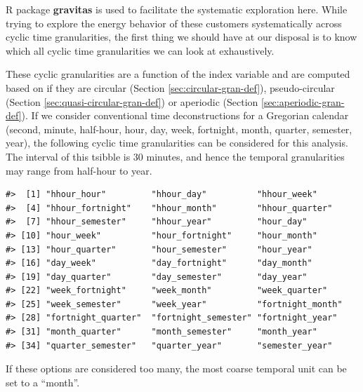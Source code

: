 \documentclass[12pt]{article}
\newenvironment{Shaded}{\begin{snugshade}}{\end{snugshade}}
\newcommand{\DataTypeTok}[1]{\textcolor[rgb]{0.13,0.29,0.53}{#1}}
\newcommand{\KeywordTok}[1]{\textcolor[rgb]{0.13,0.29,0.53}{\textbf{#1}}}
\newcommand{\NormalTok}[1]{#1}
\newcommand{\OperatorTok}[1]{\textcolor[rgb]{0.81,0.36,0.00}{\textbf{#1}}}
\newcommand{\StringTok}[1]{\textcolor[rgb]{0.31,0.60,0.02}{#1}}
\begin{document}
R package \textbf{gravitas} \citep{R-gravitas} is used to facilitate the systematic exploration here. While trying to explore the energy behavior of these customers systematically across cyclic time granularities, the first thing we should have at our disposal is to know which all cyclic time granularities we can look at exhaustively.

These cyclic granularities are a function of the index variable and are computed based on if they are circular (Section \ref{sec:circular-gran-def}), pseudo-circular (Section \ref{sec:quasi-circular-gran-def}) or aperiodic (Section \ref{sec:aperiodic-gran-def}). If we consider conventional time deconstructions for a Gregorian calendar (second, minute, half-hour, hour, day, week, fortnight, month, quarter, semester, year), the following cyclic time granularities can be considered for this analysis. The interval of this tsibble is 30 minutes, and hence the temporal granularities may range from half-hour to year.

\begin{Shaded}
\end{Shaded}

\begin{verbatim}
#>  [1] "hhour_hour"         "hhour_day"          "hhour_week"        
#>  [4] "hhour_fortnight"    "hhour_month"        "hhour_quarter"     
#>  [7] "hhour_semester"     "hhour_year"         "hour_day"          
#> [10] "hour_week"          "hour_fortnight"     "hour_month"        
#> [13] "hour_quarter"       "hour_semester"      "hour_year"         
#> [16] "day_week"           "day_fortnight"      "day_month"         
#> [19] "day_quarter"        "day_semester"       "day_year"          
#> [22] "week_fortnight"     "week_month"         "week_quarter"      
#> [25] "week_semester"      "week_year"          "fortnight_month"   
#> [28] "fortnight_quarter"  "fortnight_semester" "fortnight_year"    
#> [31] "month_quarter"      "month_semester"     "month_year"        
#> [34] "quarter_semester"   "quarter_year"       "semester_year"
\end{verbatim}

If these options are considered too many, the most coarse temporal unit can be set to a ``month''.

\begin{Shaded}
\end{Shaded}
\end{document}
